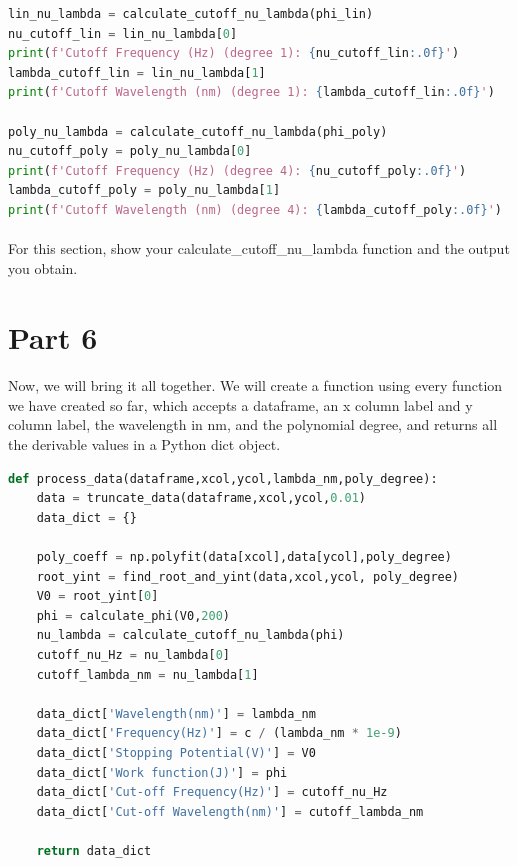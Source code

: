 \documentclass{journal}
\begin{document}
\begin{lstlisting}[language=python]
lin_nu_lambda = calculate_cutoff_nu_lambda(phi_lin)
nu_cutoff_lin = lin_nu_lambda[0]
print(f'Cutoff Frequency (Hz) (degree 1): {nu_cutoff_lin:.0f}')
lambda_cutoff_lin = lin_nu_lambda[1]
print(f'Cutoff Wavelength (nm) (degree 1): {lambda_cutoff_lin:.0f}')

poly_nu_lambda = calculate_cutoff_nu_lambda(phi_poly)
nu_cutoff_poly = poly_nu_lambda[0]
print(f'Cutoff Frequency (Hz) (degree 4): {nu_cutoff_poly:.0f}')
lambda_cutoff_poly = poly_nu_lambda[1]
print(f'Cutoff Wavelength (nm) (degree 4): {lambda_cutoff_poly:.0f}')
\end{lstlisting}

\paragraph{}
For this section, show your calculate\_cutoff\_nu\_lambda function and the output you obtain.

\section*{Part 6}
\paragraph{}
Now, we will bring it all together. We will create a function using every function we have created so far, which accepts a dataframe, an x column label and y column label, the wavelength in nm, and the polynomial degree, and returns all the derivable values in a Python dict object.

\begin{lstlisting}[language=python]
def process_data(dataframe,xcol,ycol,lambda_nm,poly_degree):
    data = truncate_data(dataframe,xcol,ycol,0.01)
    data_dict = {}

    poly_coeff = np.polyfit(data[xcol],data[ycol],poly_degree)   
    root_yint = find_root_and_yint(data,xcol,ycol, poly_degree)
    V0 = root_yint[0]
    phi = calculate_phi(V0,200)
    nu_lambda = calculate_cutoff_nu_lambda(phi)
    cutoff_nu_Hz = nu_lambda[0]
    cutoff_lambda_nm = nu_lambda[1]

    data_dict['Wavelength(nm)'] = lambda_nm
    data_dict['Frequency(Hz)'] = c / (lambda_nm * 1e-9)
    data_dict['Stopping Potential(V)'] = V0
    data_dict['Work function(J)'] = phi
    data_dict['Cut-off Frequency(Hz)'] = cutoff_nu_Hz
    data_dict['Cut-off Wavelength(nm)'] = cutoff_lambda_nm

    return data_dict
\end{lstlisting}
\end{document}
